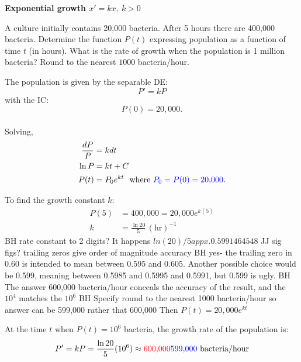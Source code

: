 \documentclass[12pt]{book}
\begin{document}
\begin{example}\label{Separaeq:expogrowth} \textbf{Exponential growth $x'=kx,\ k>0$}
\vspace{5mm}

A culture initially contains 20,000 bacteria. After 5 hours there are 400,000 bacteria. Determine the function $P(t)$ expressing population as a function of time $t$ (in hours).
What is the rate of growth when the population is 1 million bacteria?
{\color{blue}
Round to the nearest $1000$ bacteria/hour.
}

\vspace{3mm}

The population is given by the separable DE:
$$P'=kP$$
with the IC: $$P(0)=20,\!000.$$\\
Solving,
\begin{align*}
    \frac{dP}{P} & = k dt\\
    \ln P &= kt + C
    \\
    P(t) &= P_0 e^{kt}\ \text{ where } 
    {\color{blue} P_0 = P(0) = 20,\!000. }
\end{align*}

To find the growth constant $k$:
    {\color{blue}
\begin{align*}
    P(5) &= 400,\!000 = 20,\!000 e^{k (5)}\\
    k &= \frac{\ln 20}{5} \, (\text{hr})^{-1}
\end{align*}
}
{\color{teal}BH 
rate constant to 2 digits? It happens $ln(20)/5 appx. 0.5991464548$
JJ sig figs? trailing zeros give order of magnitude accuracy
BH yes- the trailing zero in 0.60 is intended to mean between 0.595 and 0.605.
Another possible choice would be 0.599, meaning between 0.5985 and 0.5995 and 0.5991, but 0.599 is ugly.
}
{\color{teal}BH The answer 600,000 bacteria/hour conceals the accuracy of the
result, and the $10^4$ matches the $10^6$
BH Specify round to the nearest 1000 bacteria/hour
so answer can be 599,000 rather that 600,000}
Then 
{\color{blue}
$P(t) = 20,\!000 e^{kt}$
}
\vspace{3mm}

At the time $t$ when $P(t) = 10^6$ bacteria, the growth rate of the population is:
$$P'= k P = \frac{\ln{20}}{5}(10^6) \approx 
{\color{red}
\text{600,000}}
{\color{blue} 599,\!000}\  \text{bacteria/hour}$$

\end{example}
\end{document}
